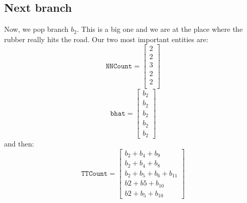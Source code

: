 \documentclass[11pt]{article}
\begin{document}
\begin{tiny}
\subsection{Next branch}

Now, we pop branch $b_2$. This is a big one and we are at the place where the rubber really hits the road. Our two most important entities are:
\begin{equation*}
\texttt{NNCount}=\left[\begin{array}{c} 2\\ 2 \\ 3 \\ 2 \\ 2 \\ \end{array} \right]
\end{equation*}
\begin{equation*}
\texttt{bhat}=\left[\begin{array}{c} b_2 \\ b_2 \\ b_2 \\ b_2 \\ b_2 \end{array} \right]
\end{equation*}
and then:
\begin{equation*}
\texttt{TTCount}=\left[\begin{array}{c}b_2+b_4+b_9 \\ b_2+ b_4 +b_8 \\ b_2+b_5+b_6+b_{11} \\ b2 + b5 + b_{10} \\ b2+b_5+b_{10}\end{array} \right]
\end{equation*}


\end{tiny}
\end{document}
